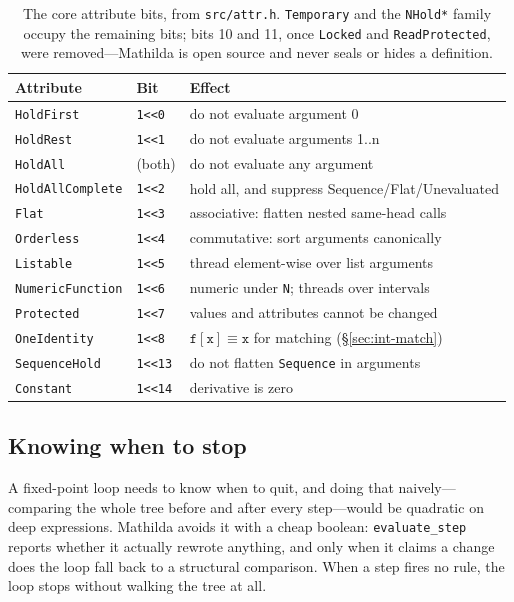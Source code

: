 \begin{table}[h]
\centering
\small
\begin{tabular}{lll}
\hline
Attribute & Bit & Effect \\
\hline
\texttt{HoldFirst} & \texttt{1<<0} & do not evaluate argument 0 \\
\texttt{HoldRest} & \texttt{1<<1} & do not evaluate arguments 1..n \\
\texttt{HoldAll} & (both) & do not evaluate any argument \\
\texttt{HoldAllComplete} & \texttt{1<<2} & hold all, and suppress Sequence/Flat/Unevaluated \\
\texttt{Flat} & \texttt{1<<3} & associative: flatten nested same-head calls \\
\texttt{Orderless} & \texttt{1<<4} & commutative: sort arguments canonically \\
\texttt{Listable} & \texttt{1<<5} & thread element-wise over list arguments \\
\texttt{NumericFunction} & \texttt{1<<6} & numeric under \texttt{N}; threads over intervals \\
\texttt{Protected} & \texttt{1<<7} & values and attributes cannot be changed \\
\texttt{OneIdentity} & \texttt{1<<8} & \(\mathtt{f[x]}\equiv\mathtt{x}\) for matching (\S\ref{sec:int-match}) \\
\texttt{SequenceHold} & \texttt{1<<13} & do not flatten \texttt{Sequence} in arguments \\
\texttt{Constant} & \texttt{1<<14} & derivative is zero \\
\hline
\end{tabular}
\caption{The core attribute bits, from \texttt{src/attr.h}. \texttt{Temporary}
and the \texttt{NHold*} family occupy the remaining bits; bits 10 and 11, once
\texttt{Locked} and \texttt{ReadProtected}, were removed---Mathilda is open source
and never seals or hides a definition.}
\label{tab:attrs}
\end{table}

\subsection*{Knowing when to stop}

A fixed-point loop needs to know when to quit, and doing that naively---comparing the
whole tree before and after every step---would be quadratic on deep expressions.
Mathilda avoids it with a cheap boolean: \texttt{evaluate\_step} reports whether it
actually rewrote anything, and only when it claims a change does the loop fall back to
a structural comparison. When a step fires no rule, the loop stops without walking the
tree at all.

